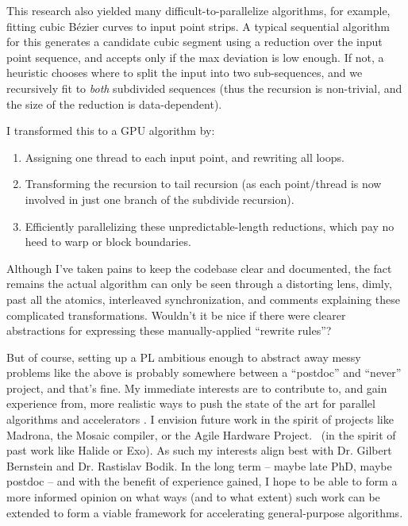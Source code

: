 This research also yielded many difficult-to-parallelize algorithms, for
example, fitting cubic Bézier curves to input point strips. A typical
sequential algorithm for this generates a candidate cubic segment
using a reduction over the input point sequence, and accepts only if
the max deviation is low enough. If not, a heuristic chooses where to
split the input into two sub-sequences, and we recursively fit
to \textit{both} subdivided sequences (thus the recursion is
non-trivial, and the size of the reduction is data-dependent).

I transformed this to a GPU algorithm by:
\begin{enumerate}
  \item Assigning one thread to each input point, and rewriting all
  loops.

  \item Transforming the recursion to tail recursion (as each
  point/thread is now involved in just one branch of the subdivide
  recursion).

  \item Efficiently parallelizing these unpredictable-length
  reductions, which pay no heed to warp or block boundaries.
\end{enumerate}

Although I've taken pains to keep the codebase clear and documented,
the fact remains the actual algorithm can only be seen through a
distorting lens, dimly, past all the atomics, interleaved
synchronization, and comments explaining these complicated
transformations. Wouldn't it be nice if there were clearer
abstractions for expressing these manually-applied ``rewrite rules''?


But of course, setting up a PL ambitious enough to abstract away messy
problems like the above is probably somewhere between a ``postdoc''
and ``never'' project, and that's fine. My immediate interests are to
contribute to, and gain experience from, more realistic ways to push
the state of the art for parallel algorithms and accelerators%
\ifdefined\STANFORD
. I envision future work in the spirit of projects like Madrona, the
Mosaic compiler, or the Agile Hardware Project.
\fi
\ifdefined\UW
\ (in the spirit of past work like Halide or Exo). As such my
interests align best with Dr. Gilbert Bernstein and Dr. Rastislav
Bodik.
\fi
In the long term -- maybe late PhD, maybe postdoc -- and with the benefit of
experience gained, I hope to be able to form a more informed opinion
on what ways (and to what extent) such work can be extended to form a
viable framework for accelerating general-purpose algorithms.



